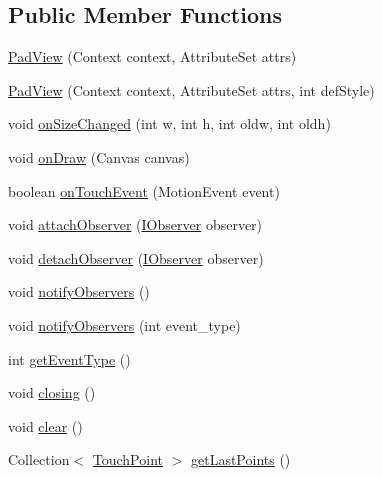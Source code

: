 \subsection*{Public Member Functions}
\begin{DoxyCompactItemize}
\item 
\hyperlink{classch_1_1zhaw_1_1ba10__bsha__1_1_1ime_1_1PadView_a08835b6a562f4b6dcab131be32589200}{PadView} (Context context, AttributeSet attrs)
\item 
\hyperlink{classch_1_1zhaw_1_1ba10__bsha__1_1_1ime_1_1PadView_a6cf8fbcde7920542f7b36c6a3c5028a9}{PadView} (Context context, AttributeSet attrs, int defStyle)
\item 
void \hyperlink{classch_1_1zhaw_1_1ba10__bsha__1_1_1ime_1_1PadView_acb791dfd686e052f61ff46a40de66b58}{onSizeChanged} (int w, int h, int oldw, int oldh)
\item 
void \hyperlink{classch_1_1zhaw_1_1ba10__bsha__1_1_1ime_1_1PadView_ac3129d73ee224efd3cd031971c810818}{onDraw} (Canvas canvas)
\item 
boolean \hyperlink{classch_1_1zhaw_1_1ba10__bsha__1_1_1ime_1_1PadView_ac9247d50f73d59730a5893447aa8ca46}{onTouchEvent} (MotionEvent event)
\item 
void \hyperlink{classch_1_1zhaw_1_1ba10__bsha__1_1_1ime_1_1PadView_a4969dbd30351775211919860ef1f8643}{attachObserver} (\hyperlink{interfacech_1_1zhaw_1_1ba10__bsha__1_1_1ime_1_1IObserver}{IObserver} observer)
\item 
void \hyperlink{classch_1_1zhaw_1_1ba10__bsha__1_1_1ime_1_1PadView_a1a924fadb8d0d1e9278a1ad136bcfb13}{detachObserver} (\hyperlink{interfacech_1_1zhaw_1_1ba10__bsha__1_1_1ime_1_1IObserver}{IObserver} observer)
\item 
void \hyperlink{classch_1_1zhaw_1_1ba10__bsha__1_1_1ime_1_1PadView_a1516c15d8011caccf368c5d709f19e01}{notifyObservers} ()
\item 
void \hyperlink{classch_1_1zhaw_1_1ba10__bsha__1_1_1ime_1_1PadView_aa3a0e6aedfc80225bf47ce3cce17db27}{notifyObservers} (int event\_\-type)
\item 
int \hyperlink{classch_1_1zhaw_1_1ba10__bsha__1_1_1ime_1_1PadView_acea9e02a6fe22cd86a909dcd20de83f0}{getEventType} ()
\item 
void \hyperlink{classch_1_1zhaw_1_1ba10__bsha__1_1_1ime_1_1PadView_a4e5d62bdc50d1efae84f0cde40beeb51}{closing} ()
\item 
void \hyperlink{classch_1_1zhaw_1_1ba10__bsha__1_1_1ime_1_1PadView_a5bfac21895a5740fef99268846f223ef}{clear} ()
\item 
Collection$<$ \hyperlink{classch_1_1zhaw_1_1ba10__bsha__1_1_1TouchPoint}{TouchPoint} $>$ \hyperlink{classch_1_1zhaw_1_1ba10__bsha__1_1_1ime_1_1PadView_aea9a4c4f77ccfdfddfad16cdcc200107}{getLastPoints} ()
\end{DoxyCompactItemize}
